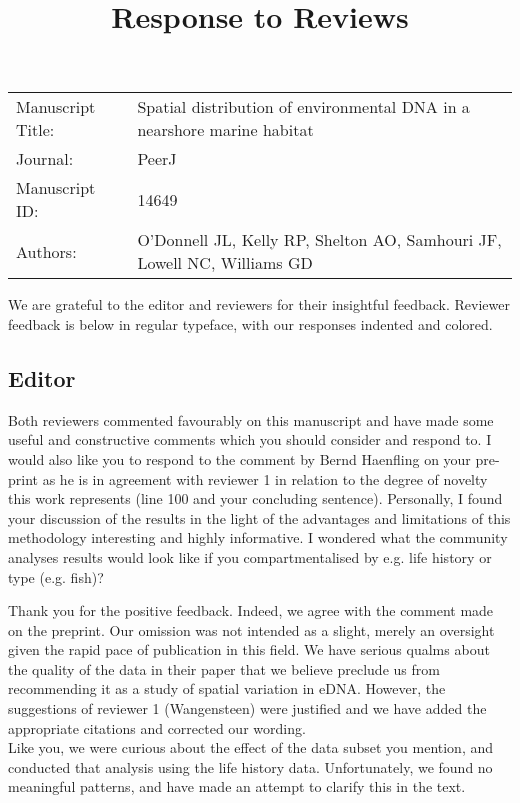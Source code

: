 \documentclass{article}
\newenvironment{response}
	{
	\begin{adjustwidth}{1cm}{0cm}
	\color{peerjBlue}
	}
	{
	\end{adjustwidth}
	}
\begin{document}
\title{Response to Reviews}

\maketitle


\begin{tabular}{ l l }
Manuscript Title: &
Spatial distribution of environmental DNA in a nearshore marine habitat
\\
Journal: &
PeerJ
\\
Manuscript ID: &
14649
\\
Authors: &
O'Donnell JL,
Kelly RP,
Shelton AO,
Samhouri JF,
Lowell NC,
Williams GD
\\
\end{tabular}

\bigskip

We are grateful to the editor and reviewers for their insightful feedback.
Reviewer feedback is below in regular typeface, with our responses indented and colored.

\subsection*{Editor}
Both reviewers commented favourably on this manuscript and have made some useful and constructive comments which you should consider and respond to. I would also like you to respond to the comment by Bernd Haenfling on your pre-print as he is in agreement with reviewer 1 in relation to the degree of novelty this work represents (line 100 and your concluding sentence). Personally, I found your discussion of the results in the light of the advantages and limitations of this methodology interesting and highly informative. I wondered what the community analyses results would look like if you compartmentalised by e.g. life history or type (e.g. fish)?

\begin{response}
  Thank you for the positive feedback.
	Indeed, we agree with the comment made on the preprint.
	Our omission was not intended as a slight, merely an oversight given the rapid pace of publication in this field.
	We have serious qualms about the quality of the data in their paper that we believe preclude us from recommending it as a study of spatial variation in eDNA.
	However, the suggestions of reviewer 1 (Wangensteen) were justified and we have added the appropriate citations and corrected our wording.
	\\

	Like you, we were curious about the effect of the data subset you mention, and conducted that analysis using the life history data. Unfortunately, we found no meaningful patterns, and have made an attempt to clarify this in the text.
	\\
\end{response}
\end{document}
